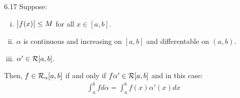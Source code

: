 \begin{theorem}{}{6.17}
    Suppose:
    \begin{enumerate}[(i)]
        \item $\abs{f(x)} \leq M$ for all $x \in [a, b]$.
        \item $\alpha$ is continuous and increasing on $[a, b]$ and differentable on $(a, b)$.
        \item $\alpha' \in \mathcal{R}[a, b]$. 
    \end{enumerate}
    Then, $f \in \mathcal{R}_\alpha[a, b]$ if and only if $f\alpha' \in \mathcal{R}[a, b]$ and in this case:
    \begin{align*}
        \int_a^b fd\alpha = \int_a^b f(x)\alpha'(x)dx
    \end{align*}
\end{theorem}

